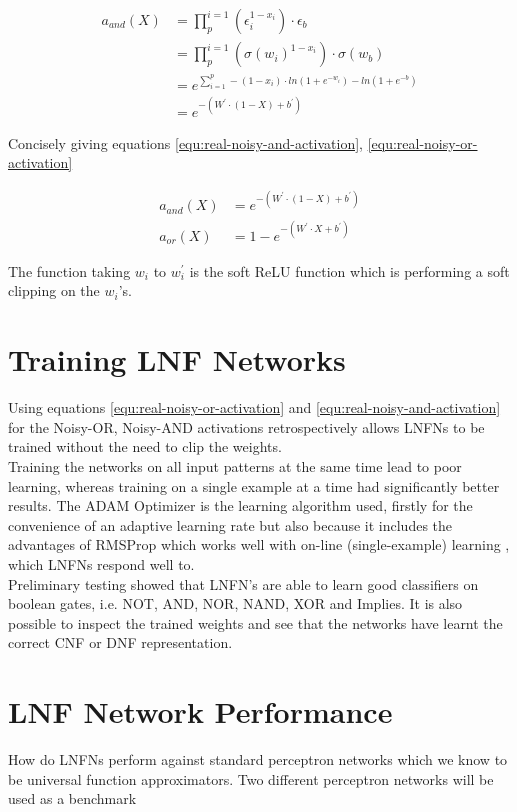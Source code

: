 \begin{align*}
a_{and}(X) &= \prod_{p}^{i=1} (\epsilon_i^{1 - x_i}) \cdot \epsilon_b\\
&= \prod_{p}^{i=1} (\sigma(w_i)^{1 - x_i}) \cdot \sigma(w_b)\\
&= e^{\sum^p_{i=1} -(1 - x_i) \cdot ln(1 + e^{-w_i}) - ln(1 + e^{-b})} \\
&= e^{-(W^{'} \cdot (1 - X) + b^{'})}
\end{align*}

Concisely giving equations \ref{equ:real-noisy-and-activation}, \ref{equ:real-noisy-or-activation}

\begin{align}
a_{and}(X) &= e^{-(W^{'} \cdot (1 - X) + b^{'})} \label{equ:real-noisy-and-activation}\\
a_{or}(X)&= 1 - e^{-(W^{'} \cdot X + b^{'})} \label{equ:real-noisy-or-activation}
\end{align}

The function taking $w_i$ to $w_i^{'}$ is the soft ReLU function which is performing a soft clipping on the $w_i$'s. 

\section{Training LNF Networks}
Using equations \ref{equ:real-noisy-or-activation} and \ref{equ:real-noisy-and-activation} for the Noisy-OR, Noisy-AND activations retrospectively allows LNFNs to be trained without the need to clip the weights.\\

Training the networks on all input patterns at the same time lead to poor learning, whereas training on a single example at a time had significantly better results. The ADAM Optimizer is the learning algorithm used, firstly for the convenience of an adaptive learning rate but also because it includes the advantages of RMSProp which works well with on-line (single-example) learning \cite{kingma2014adam}, which LNFNs respond well to.\\

Preliminary testing showed that LNFN's are able to learn good classifiers on boolean gates, i.e. NOT, AND, NOR, NAND, XOR and Implies. It is also possible to inspect the trained weights and see that the networks have learnt the correct CNF or DNF representation.

\section{LNF Network Performance}
How do LNFNs perform against standard perceptron networks which we know to be universal function approximators. Two different perceptron networks will be used as a benchmark

